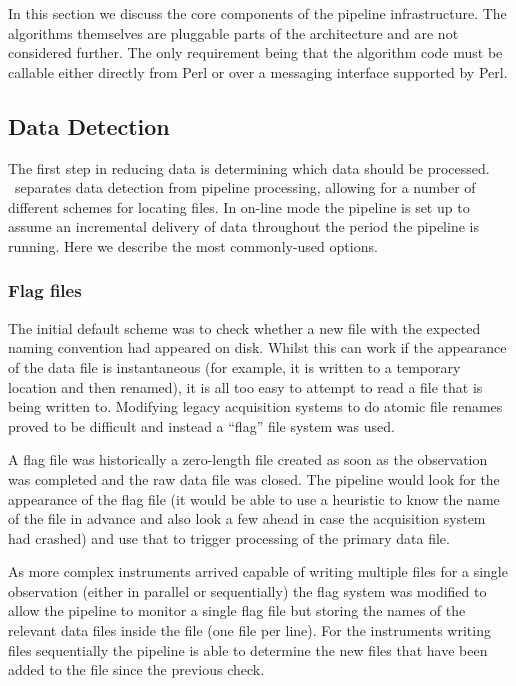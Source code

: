 \documentclass[final,authoryear,5p,times,twocolumn]{elsarticle}
\begin{document}
In this section we discuss the core components of the pipeline
infrastructure. The algorithms themselves are pluggable parts of the
architecture and are not considered further. The only requirement
being that the algorithm code must be callable either directly from
Perl or over a messaging interface supported by Perl.

\subsection{Data Detection}

The first step in reducing data is determining which data should be
processed. \oracdr\ separates data detection from pipeline processing,
allowing for a number of different schemes for locating files. In
on-line mode the pipeline is set up to assume an incremental delivery
of data throughout the period the pipeline is running. Here we
describe the most commonly-used options.

\subsubsection{Flag files}

The initial default scheme was to check whether a new file with the
expected naming convention had appeared on disk. Whilst this can work
if the appearance of the data file is instantaneous (for example, it
is written to a temporary location and then renamed), it is all too
easy to attempt to read a file that is being written to. Modifying
legacy acquisition systems to do atomic file renames proved to be
difficult and instead a ``flag'' file system was used.

A flag file was historically a zero-length file created as soon as the
observation was completed and the raw data file was closed. The
pipeline would look for the appearance of the flag file (it would be
able to use a heuristic to know the name of the file in advance and
also look a few ahead in case the acquisition system had crashed) and
use that to trigger processing of the primary data file.

As more complex instruments arrived capable of writing multiple files
for a single observation (either in parallel or sequentially)
\citep{2009MNRAS.399.1026B,2013MNRAS.430.2513H} the flag system was
modified to allow the pipeline to monitor a single flag file but
storing the names of the relevant data files inside the file (one file
per line). For the instruments writing files sequentially the pipeline
is able to determine the new files that have been added to the file
since the previous check.
\end{document}
